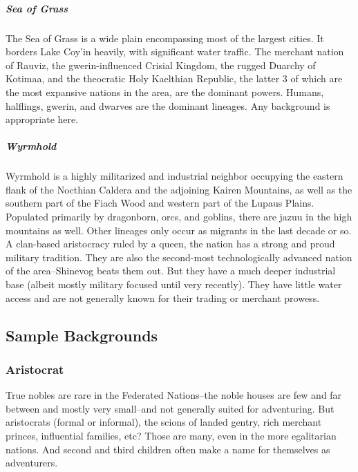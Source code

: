 \subparagraph*{Sea of Grass}
The Sea of Grass is a wide plain encompassing most of the largest cities. It borders Lake Coy'in heavily, with significant water traffic. The merchant nation of Rauviz, the gwerin-influenced Crisial Kingdom, the rugged Duarchy of Kotimaa, and the theocratic Holy Kaelthian Republic, the latter 3 of which are the most expansive nations in the area, are the dominant powers. Humans, halflings, gwerin, and dwarves are the dominant lineages. Any background is appropriate here.

\subparagraph*{Wyrmhold}
Wyrmhold is a highly militarized and industrial neighbor occupying the eastern flank of the Nocthian Caldera and the adjoining Kairen Mountains, as well as the southern part of the Fiach Wood and western part of the Lupaus Plains. Populated primarily by dragonborn, orcs, and goblins, there are jazuu in the high mountains as well. Other lineages only occur as migrants in the last decade or so. A clan-based aristocracy ruled by a queen, the nation has a strong and proud military tradition. They are also the second-most technologically advanced nation of the area--Shinevog beats them out. But they have a much deeper industrial base (albeit mostly military focused until very recently). They have little water access and are not generally known for their trading or merchant prowess.

\subsection{Sample Backgrounds}
\subsubsection{Aristocrat}

True nobles are rare in the Federated Nations--the noble houses are few and far between and mostly very small--and not generally suited for adventuring. But aristocrats (formal or informal), the scions of landed gentry, rich merchant princes, influential families, etc? Those are many, even in the more egalitarian nations. And second and third children often make a name for themselves as adventurers.

